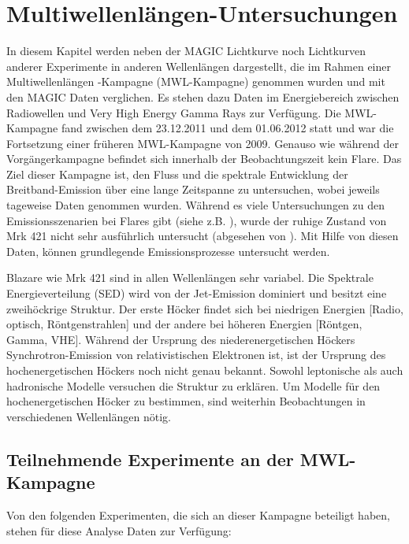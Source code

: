 \chapter{Multiwellenlängen-Untersuchungen}
\label{chapter:MWL}
In diesem Kapitel werden neben der MAGIC Lichtkurve noch Lichtkurven anderer Experimente in anderen Wellenlängen dargestellt, die im Rahmen einer Multiwellenlängen -Kampagne (MWL-Kampagne)  genommen wurden und mit den MAGIC Daten verglichen.
Es stehen dazu Daten im Energiebereich zwischen Radiowellen und Very High Energy Gamma Rays zur Verfügung.
Die MWL-Kampagne fand zwischen dem 23.12.2011 und dem 01.06.2012 statt und war die Fortsetzung einer früheren MWL-Kampagne von 2009.
Genauso wie während der Vorgängerkampagne befindet sich innerhalb der Beobachtungszeit kein Flare.
Das Ziel dieser Kampagne ist, den Fluss und die spektrale Entwicklung der Breitband-Emission über eine lange Zeitspanne zu untersuchen, wobei jeweils tageweise Daten genommen wurden.
Während es viele Untersuchungen zu den Emissionsszenarien bei Flares gibt (siehe z.B. \cite{Mrk421Flare}), wurde der ruhige Zustand von Mrk 421 nicht sehr ausführlich untersucht (abgesehen von \cite{MWL2009}).
Mit Hilfe von diesen Daten, können grundlegende Emissionsprozesse untersucht werden.

Blazare wie Mrk 421 sind in allen Wellenlängen sehr variabel.
Die Spektrale Energieverteilung (SED) wird von der Jet-Emission dominiert und besitzt eine zweihöckrige Struktur.
Der erste Höcker findet sich bei niedrigen Energien [Radio, optisch, Röntgenstrahlen] und der andere bei höheren Energien [Röntgen, Gamma, VHE].
Während der Ursprung des niederenergetischen Höckers Synchrotron-Emission von relativistischen Elektronen ist, ist der Ursprung des hochenergetischen Höckers noch nicht genau bekannt.
Sowohl leptonische als auch hadronische Modelle versuchen die Struktur zu erklären.
Um Modelle für den hochenergetischen Höcker zu bestimmen, sind weiterhin Beobachtungen in verschiedenen Wellenlängen nötig. 
 

\section{Teilnehmende Experimente an der MWL-Kampagne}
Von den folgenden Experimenten, die sich an dieser Kampagne beteiligt haben, stehen für diese Analyse Daten zur Verfügung:

